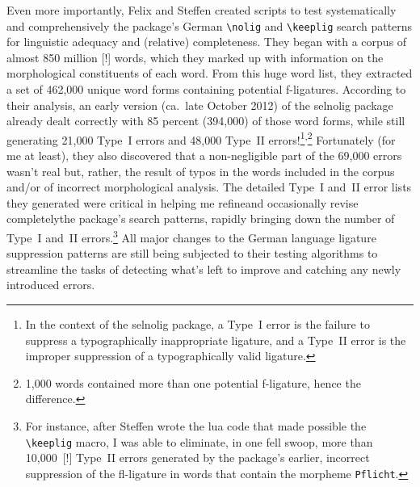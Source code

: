 \documentclass[11pt]{article}
\newcommand{\pkg}[1]{\textsf{#1}}
\newcommand{\opt}[1]{\texttt{#1}}
\newcommand{\cmmd}[1]{\texttt{\textbackslash #1}}
\begin{document}
Even more importantly, Felix and Steffen created scripts to test systematically and comprehensively the package's German \cmmd{nolig} and \cmmd{keeplig} search patterns for linguistic adequacy and (relative) completeness.
They began with a corpus of almost 850 million [!] words, which they marked up with information on the morphological constituents of each word. From this huge word list, they extracted a set of 462,000 unique word forms containing potential f-ligatures.
According to their analysis, an early version (ca.\ late October 2012) of the \pkg{selnolig} package already dealt correctly with 85 percent (394,000) of those word forms, while still generating 21,000 Type~I errors and 48,000 Type~II errors!\footnote{In the context of the \pkg{selnolig} package, a Type~I error is the failure to suppress a typographically inappropriate ligature, and a Type~II error is the improper suppression of a typographically valid ligature.}\textsuperscript{,}\footnote{1,000 words contained more than one potential f-ligature, hence the difference.} 
Fortunately (for me at least), they also discovered that a non-negligible part of the 69,000 errors wasn't real but, rather, the result of typos in the words included in the corpus and/or of incorrect morphological analysis. The detailed Type~I and~II error lists they generated were critical in helping me refine\textemdash and occasionally revise completely\textemdash the package's search patterns, rapidly bringing down the number of Type~I and~II errors.\footnote{For instance, after Steffen wrote the lua code that made possible the \cmmd{keeplig} macro, I was able to eliminate, in one fell swoop, more than 10,000~[!] Type~II errors generated by the package's earlier, incorrect suppression of the fl-ligature in words that contain the morpheme \opt{Pflicht}. } All major changes to the German language ligature suppression patterns are still being subjected to their testing algorithms to streamline the tasks of detecting what's left to improve and catching any newly introduced errors.
\end{document}
